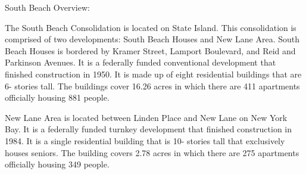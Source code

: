 South Beach Overview:      

    

The South Beach Consolidation is located on State Island. This consolidation is comprised of two developments: South Beach Houses and New Lane Area. South Beach Houses is bordered by Kramer Street, Lamport Boulevard, and Reid and Parkinson Avenues. It is a federally funded conventional development that finished construction in 1950. It is made up of eight residential buildings that are 6- stories tall. The buildings cover 16.26 acres in which there are 411 apartments officially housing 881 people.  



New Lane Area is located between Linden Place and New Lane on New York Bay. It is a federally funded turnkey development that finished construction in 1984. It is a single residential building that is 10- stories tall that exclusively houses seniors. The building covers 2.78 acres in which there are 275 apartments officially housing 349 people.